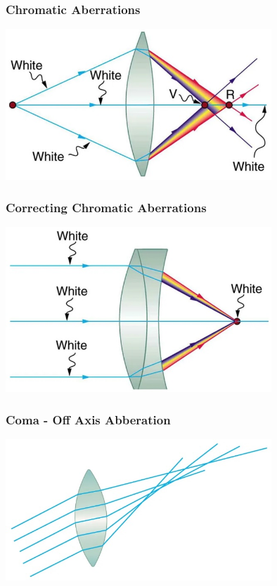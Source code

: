 \documentclass{beamer}
\begin{document}
\begin{frame}\frametitle{Chromatic Aberrations}

\begin{center}
\includegraphics[width=10cm]{fig/chromeAbb.jpg}
\end{center}

\end{frame}

\begin{frame}\frametitle{Correcting Chromatic Aberrations}

\begin{center}
\includegraphics[width=10cm]{fig/chromeAbb2.jpg}
\end{center}

\end{frame}

\begin{frame}\frametitle{Coma - Off Axis Abberation}

\begin{center}
\includegraphics[width=10cm]{fig/coma.jpg}
\end{center}

\end{frame}
\end{document}
